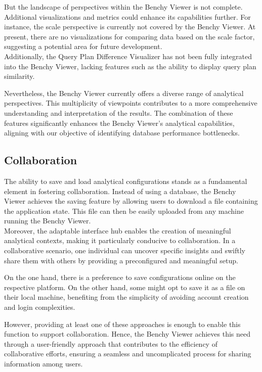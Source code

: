 But the landscape of perspectives within the Benchy Viewer is not complete. Additional visualizations and metrics could enhance its capabilities further. For instance, the scale perspective is currently not covered by the Benchy Viewer. At present, there are no visualizations for comparing data based on the scale factor, suggesting a potential area for future development.\\
Additionally, the Query Plan Difference Visualizer \parencite*{semantic-diff} has not been fully integrated into the Benchy Viewer, lacking features such as the ability to display query plan similarity.

Nevertheless, the Benchy Viewer currently offers a diverse range of analytical perspectives. This multiplicity of viewpoints contributes to a more comprehensive understanding and interpretation of the results. The combination of these features significantly enhances the Benchy Viewer's analytical capabilities, aligning with our objective of identifying database performance bottlenecks.





\subsection{Collaboration}

The ability to save and load analytical configurations stands as a fundamental element in fostering collaboration. Instead of using a database, the Benchy Viewer achieves the saving feature by allowing users to download a file containing the application state. This file can then be easily uploaded from any machine running the Benchy Viewer.\\
Moreover, the adaptable interface hub enables the creation of meaningful analytical contexts, making it particularly conducive to collaboration. In a collaborative scenario, one individual can uncover specific insights and swiftly share them with others by providing a preconfigured and meaningful setup. 

On the one hand, there is a preference to save configurations online on the respective platform. On the other hand, some might opt to save it as a file on their local machine, benefiting from the simplicity of avoiding account creation and login complexities.

However, providing at least one of these approaches is enough to enable this function to support collaboration. Hence, the Benchy Viewer achieves this need through a user-friendly approach that contributes to the efficiency of collaborative efforts, ensuring a seamless and uncomplicated process for sharing information among users.
  


